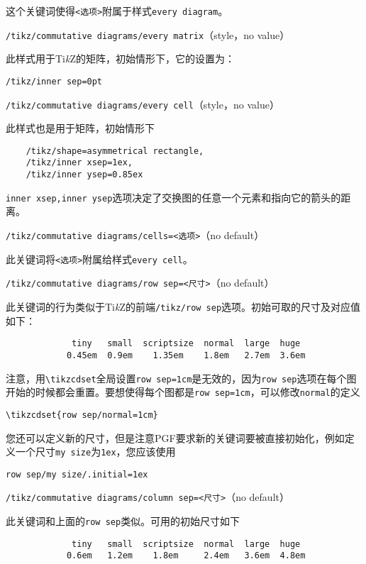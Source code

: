 \documentclass{ctexart}
\begin{document}
这个关键词使得\verb|<选项>|附属于样式\verb|every diagram|。

{\color{red}\texttt{/tikz/commutative diagrams/every matrix}}\hfill （style，no value）

此样式用于Ti\emph{k}Z的矩阵，初始情形下，它的设置为：

\verb|/tikz/inner sep=0pt|

{\color{red}\texttt{/tikz/commutative diagrams/every cell}}\hfill （style，no value）

此样式也是用于矩阵，初始情形下
\begin{lstlisting}
    /tikz/shape=asymmetrical rectangle,
    /tikz/inner xsep=1ex,
    /tikz/inner ysep=0.85ex
\end{lstlisting}

\texttt{inner xsep,inner ysep}选项决定了交换图的任意一个元素和指向它的箭头的距离。

{\color{red}\texttt{/tikz/commutative diagrams/cells=<选项>}}\hfill （no default）

此关键词将\verb|<选项>|附属给样式\verb|every cell|。

{\color{red}\texttt{/tikz/commutative diagrams/row sep=<尺寸>}}\hfill （no default）

此关键词的行为类似于Ti\emph{k}Z的前端\texttt{/tikz/row sep}选项。初始可取的尺寸及对应值如下：
\begin{lstlisting}
             tiny   small  scriptsize  normal  large  huge
            0.45em  0.9em    1.35em    1.8em   2.7em  3.6em
\end{lstlisting}

注意，用\verb|\tikzcdset|全局设置\verb|row sep=1cm|是无效的，因为\verb|row sep|选项在每个图开始的时候都会重置。要想使得每个图都是\verb|row sep=1cm|，可以修改\verb|normal|的定义

\verb|\tikzcdset{row sep/normal=1cm}|

您还可以定义新的尺寸，但是注意PGF要求新的关键词要被直接初始化，例如定义一个尺寸\verb|my size|为\verb|1ex|，您应该使用

\verb|row sep/my size/.initial=1ex|

{\color{red}\texttt{/tikz/commutative diagrams/column sep=<尺寸>}}\hfill （no default）

此关键词和上面的\verb|row sep|类似。可用的初始尺寸如下
\begin{lstlisting}
             tiny   small  scriptsize  normal  large  huge
            0.6em   1.2em    1.8em     2.4em   3.6em  4.8em
\end{lstlisting}
\end{document}
